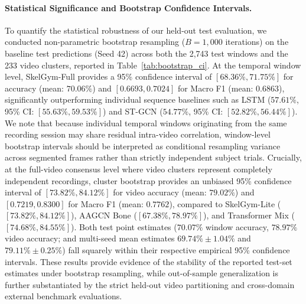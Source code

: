 \documentclass[runningheads]{llncs}
\begin{document}
\paragraph{Statistical Significance and Bootstrap Confidence Intervals.} To quantify the statistical robustness of our held-out test evaluation, we conducted non-parametric bootstrap resampling ($B=1,000$ iterations) \cite{efron1993} on the baseline test predictions (Seed 42) across both the 2,743 test windows and the 233 video clusters, reported in Table~\ref{tab:bootstrap_ci}. At the temporal window level, SkelGym-Full provides a 95\% confidence interval of $[68.36\%, 71.75\%]$ for accuracy (mean: $70.06\%$) and $[0.6693, 0.7024]$ for Macro F1 (mean: $0.6863$), significantly outperforming individual sequence baselines such as LSTM ($57.61\%$, 95\% CI: $[55.63\%, 59.53\%]$) and ST-GCN ($54.77\%$, 95\% CI: $[52.82\%, 56.44\%]$). We note that because individual temporal windows originating from the same recording session may share residual intra-video correlation, window-level bootstrap intervals should be interpreted as conditional resampling variance across segmented frames rather than strictly independent subject trials. Crucially, at the full-video consensus level where video clusters represent completely independent recordings, cluster bootstrap provides an unbiased 95\% confidence interval of $[73.82\%, 84.12\%]$ for video accuracy (mean: $79.02\%$) and $[0.7219, 0.8300]$ for Macro F1 (mean: $0.7762$), compared to SkelGym-Lite ($[73.82\%, 84.12\%]$), AAGCN Bone ($[67.38\%, 78.97\%]$), and Transformer Mix ($[74.68\%, 84.55\%]$). Both test point estimates ($70.07\%$ window accuracy, $78.97\%$ video accuracy; and multi-seed mean estimates $69.74\% \pm 1.04\%$ and $79.11\% \pm 0.25\%$) fall squarely within their respective empirical 95\% confidence intervals. These results provide evidence of the stability of the reported test-set estimates under bootstrap resampling, while out-of-sample generalization is further substantiated by the strict held-out video partitioning and cross-domain external benchmark evaluations.
\end{document}
